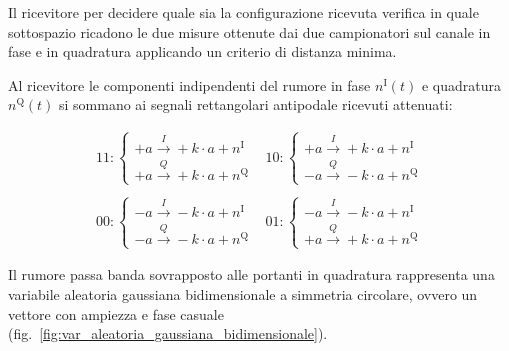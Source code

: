 Il ricevitore per decidere quale sia la configurazione ricevuta verifica in quale sottospazio ricadono le due misure ottenute dai due campionatori sul canale in fase e in quadratura applicando un criterio di distanza minima.

Al ricevitore le componenti indipendenti del rumore in fase $n^\text{I}(t)$ e quadratura $n^\text{Q}(t)$ si sommano ai segnali rettangolari antipodale ricevuti attenuati:

\[\begin{array}{ll}
11\colon\begin{cases}
+a\stackrel{I}{\longrightarrow}+k\cdot a+n^\text{I} \\
+a\stackrel{Q}{\longrightarrow}+k\cdot a+n^\text{Q}
\end{cases} &
10\colon\begin{cases}
+a\stackrel{I}{\longrightarrow}+k\cdot a+n^\text{I} \\
-a\stackrel{Q}{\longrightarrow}-k\cdot a+n^\text{Q}
\end{cases} \\\\
00\colon\begin{cases}
-a\stackrel{I}{\longrightarrow}-k\cdot a+n^\text{I} \\
-a\stackrel{Q}{\longrightarrow}-k\cdot a+n^\text{Q}
\end{cases}	&
01\colon\begin{cases}
-a\stackrel{I}{\longrightarrow}-k\cdot a+n^\text{I} \\
+a\stackrel{Q}{\longrightarrow}+k\cdot a+n^\text{Q}
\end{cases}
\end{array}\]

Il rumore passa banda sovrapposto alle portanti in quadratura rappresenta una variabile aleatoria gaussiana bidimensionale a simmetria circolare, ovvero un vettore con ampiezza e fase casuale (fig.~\ref{fig:var_aleatoria_gaussiana_bidimensionale}).

